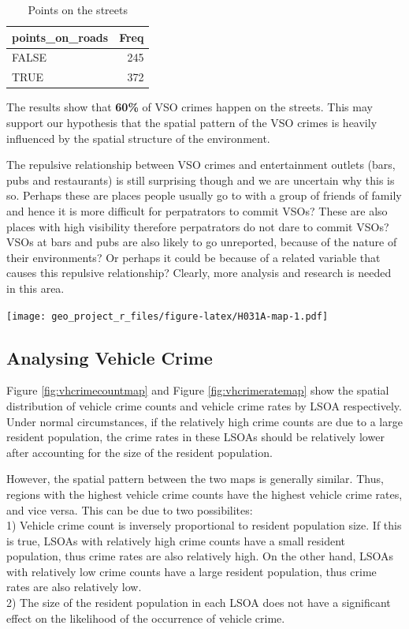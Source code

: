 \documentclass[]{article}
\begin{document}
\begin{table}

\caption{\label{tab:COL001F-roads-intersect}Points on the streets}
\centering
\begin{tabular}[t]{l|r}
\hline
points\_on\_roads & Freq\\
\hline
FALSE & 245\\
\hline
TRUE & 372\\
\hline
\end{tabular}
\end{table}

The results show that \textbf{60\%} of VSO crimes happen on the streets.
This may support our hypothesis that the spatial pattern of the VSO
crimes is heavily influenced by the spatial structure of the
environment.

The repulsive relationship between VSO crimes and entertainment outlets
(bars, pubs and restaurants) is still surprising though and we are
uncertain why this is so. Perhaps these are places people usually go to
with a group of friends of family and hence it is more difficult for
perpatrators to commit VSOs? These are also places with high visibility
therefore perpatrators do not dare to commit VSOs? VSOs at bars and pubs
are also likely to go unreported, because of the nature of their
environments? Or perhaps it could be because of a related variable that
causes this repulsive relationship? Clearly, more analysis and research
is needed in this area.

\texttt{[image: geo\_project\_r\_files/figure-latex/H031A-map-1.pdf]}

\subsection{Analysing Vehicle Crime}\label{analysing-vehicle-crime}

Figure \ref{fig:vhcrimecountmap} and Figure \ref{fig:vhcrimeratemap}
show the spatial distribution of vehicle crime counts and vehicle crime
rates by LSOA respectively. Under normal circumstances, if the
relatively high crime counts are due to a large resident population, the
crime rates in these LSOAs should be relatively lower after accounting
for the size of the resident population.

However, the spatial pattern between the two maps is generally similar.
Thus, regions with the highest vehicle crime counts have the highest
vehicle crime rates, and vice versa. This can be due to two
possibilites:\\
1) Vehicle crime count is inversely proportional to resident population
size. If this is true, LSOAs with relatively high crime counts have a
small resident population, thus crime rates are also relatively high. On
the other hand, LSOAs with relatively low crime counts have a large
resident population, thus crime rates are also relatively low.\\
2) The size of the resident population in each LSOA does not have a
significant effect on the likelihood of the occurrence of vehicle crime.
\end{document}
